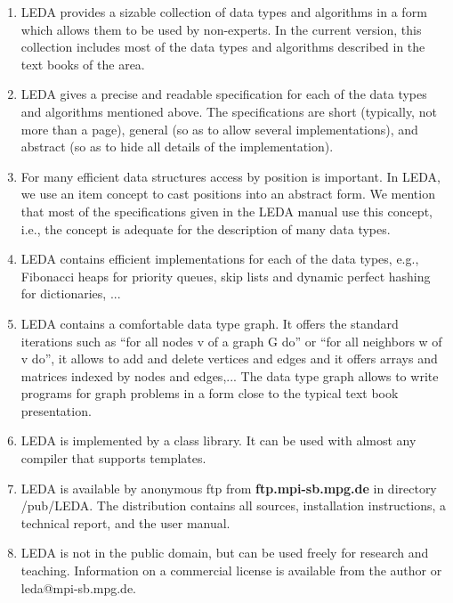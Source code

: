 \begin{enumerate}
\item 
    LEDA provides a sizable collection of data types and algorithms in a form 
    which allows them to be used by non-experts. In the current version, this
    collection includes most of the data types and algorithms described in the 
    text books of the area. 

\item 
    LEDA gives a precise and readable specification for each of the data types 
    and algorithms mentioned above.  The specifications are short (typically, 
    not more than a page), general (so as to allow several implementations), 
    and abstract (so as to hide all details of the implementation). 

\item
    For many efficient data structures access by position is important. In 
    LEDA, we use an item concept to cast positions into an abstract form. We 
    mention that most of the specifications given in the LEDA manual use this 
    concept, i.e., the concept is adequate for the description of many data 
    types. 

\item
    LEDA contains efficient implementations for each of the data types, e.g., 
    Fibonacci heaps for priority queues, skip lists and dynamic perfect 
    hashing for dictionaries, ...


\item
    LEDA contains a comfortable data type graph. It offers the standard 
    iterations such as ``for all nodes v of a graph G do'' or ``for all 
    neighbors w of v do'', it allows to add and delete vertices and edges 
    and it offers arrays and matrices indexed by nodes and edges,...  
    The data type graph allows to write programs for graph problems in a 
    form close to the typical text book presentation.


\item 
    LEDA is implemented by a \CC class library. It can be used with almost
    any \CC compiler that supports templates. 


\item
    {LEDA is available by anonymous ftp from {\bf ftp.mpi-sb.mpg.de} in
    directory /pub/LEDA. The distribution contains all sources, installation 
    instructions, a technical report, and the user manual.}


\item
    LEDA is not in the public domain, but can be used freely for research 
    and teaching. Information on a commercial license is available from the 
    author or leda@mpi-sb.mpg.de.

\end{enumerate}

